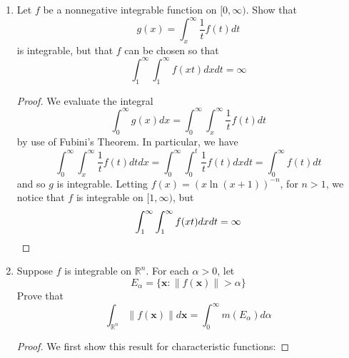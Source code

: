 \documentclass[12pt,leqno]{article}
\numberwithin{equation}{section}
\theoremstyle{definition}
\begin{document}
\begin{enumerate}
\item Let $f$ be a nonnegative integrable function on $[0,\infty)$. Show that \[g(x)=\int_x^{\infty}\frac{1}{t}f(t)dt\] is integrable, but that $f$ can be chosen so that \[\int_1^{\infty}\int_1^{\infty}f(xt)dxdt=\infty\]

\begin{proof}
 We evaluate the integral \[\int_0^{\infty}g(x)dx=\int_0^{\infty}\int_x^{\infty}\frac{1}{t}f(t)dt\] by use of Fubini's Theorem. In particular, we have \[\int_0^{\infty}\int_x^{\infty}\frac{1}{t}f(t)dtdx=\int_0^{\infty}\int_0^t\frac{1}{t}f(t)dxdt=\int_0^{\infty}f(t)dt\]and so $g$ is integrable. Letting $f(x)=\left(x\ln\left(x+1\right)\right)^{-n}$, for $n>1$, we notice that $f$ is integrable on $[1,\infty)$, but \[\int_1^{\infty}\int_1^{\infty}f(xt)dxdt=\infty\qedhere\]
\end{proof}

\item Suppose $f$ is integrable on $\mathbb{R}^n$. For each $\alpha>0$, let \[E_{\alpha}=\{\mathbf{x}:\|f(\mathbf{x})\|>\alpha\}\] Prove that \[\int_{\mathbb{R}^n}\|f(\mathbf{x})\|d\mathbf{x}=\int_0^{\infty}m(E_{\alpha})d\alpha\]

\begin{proof}
 We first show this result for characteristic functions:


\end{proof}
\end{enumerate}
\end{document}
